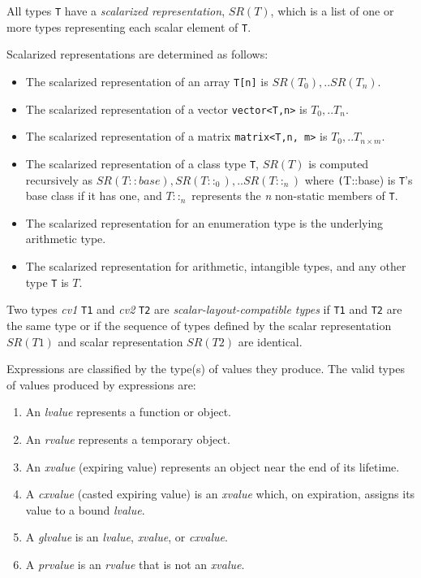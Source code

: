 \p All types \texttt{T} have a \textit{scalarized representation}, \(SR(T)\),
which is a list of one or more types representing each scalar element of
\texttt{T}.

\p Scalarized representations are determined as follows:
\begin{itemize}
\item The scalarized representation of an array \texttt{T[n]} is \(SR(T_0), ..
SR(T_n)\).

\item The scalarized representation of a vector \texttt{vector<T,n>} is \(T_0,
.. T_n\).

\item The scalarized representation of a matrix \texttt{matrix<T,n, m>} is
\(T_0, .. T_{n \times m}\).

\item The scalarized representation of a class type \texttt{T}, \(SR(T)\) is
computed recursively as \(SR(T::base), SR(T::_0), .. SR(T::_n)\) where
\texttt(T::base) is \texttt{T}'s base class if it has one, and \(T::_n\)
represents the \textit{n} non-static members of \texttt{T}.

\item The scalarized representation for an enumeration type is the underlying
arithmetic type.

\item The scalarized representation for arithmetic, intangible types, and any other
type \texttt{T} is \(T\).
\end{itemize}

\p Two types \textit{cv1} \texttt{T1} and \textit{cv2} \texttt{T2} are
\textit{scalar-layout-compatible types} if \texttt{T1} and \texttt{T2} are the same
type or if the sequence of types defined by the scalar representation \(SR(T1)\)
and scalar representation \(SR(T2)\) are identical.


\p Expressions are classified by the type(s) of values they produce. The valid
types of values produced by expressions are:

\begin{enumerate}
  \item An \textit{lvalue} represents a function or object.
  \item An \textit{rvalue} represents a temporary object.
  \item An \textit{xvalue} (expiring value) represents an object near the end
  of its lifetime.
  \item A \textit{cxvalue} (casted expiring value) is an \textit{xvalue}
  which, on expiration, assigns its value to a bound \textit{lvalue}.
  \item A \textit{glvalue} is an \textit{lvalue}, \textit{xvalue}, or
  \textit{cxvalue}.
  \item A \textit{prvalue} is an \textit{rvalue} that is not an \textit{xvalue}.
\end{enumerate}

